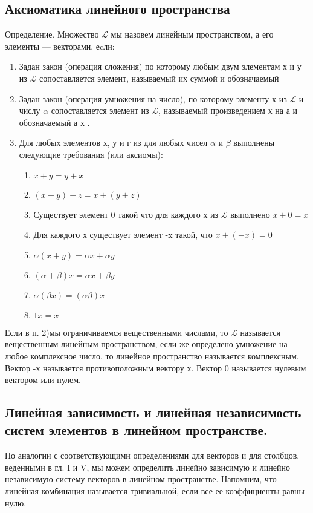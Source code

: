 \documentclass[11pt; a4paper]{report}
\theoremstyle{plain} %
\theoremstyle{defenition}
\theoremstyle{remark}
\begin{document}
\subsection{\Large Аксиоматика линейного пространства}
Определение. Множество $\mathscr{L}$ мы назовем линейным пространством, а его элементы — векторами, еcли:
\begin{enumerate}
\item Задан закон (операция сложения) по которому любым двум элементам х и у из  $\mathscr{L}$ сопоставляется элемент, называемый их суммой и обозначаемый 
\item Задан закон (операция умножения на число), по которому элементу х из $\mathscr{L}$ и числу $\alpha$ сопоставляется элемент из $\mathscr{L}$, называемый произведением х на а и обозна­чаемый а х .
\item Для любых элементов х, у и г из для любых чисел $\alpha$ и $\beta$ выполнены следующие требования (или аксиомы):
\begin{enumerate}
\item $x+y = y+x$
\item $(x + y) + z = x + (y + z)$
\item Существует элемент 0 такой что для каждого х из $\mathscr{L}$ выполнено $x + 0=x$
\item Для каждого х существует элемент -x такой, что $x + (-x) = 0$
\item $\alpha(x+y) = \alpha x + \alpha y$
\item $ (\alpha + \beta)x = \alpha x+\beta y$
\item $ \alpha( \beta x) = (\alpha \beta) x$
\item $1x = x$
\end{enumerate}
\end{enumerate}

Если в п. 2)мы ограничиваемся вещественными чис­лами, то $\mathscr{L}$ называется вещественным линейным прост­ранством, если же определено умножение на любое комплексное число, то линейное пространство называется комплексным.
Вектор -х называется противоположным вектору х.
Вектор 0 называется нулевым вектором или нулем.

\subsection{\Large Линейная зависимость и линейная независимость систем элементов в линейном пространстве.}
По аналогии с соответствую­щими определениями для векторов и для столбцов, веденными в гл. I и V, мы можем определить линейно зависимую и линейно независимую систему векторов в линейном пространстве. Напомним, что линейная комбина­ция называется тривиальной, если все ее коэффициенты равны нулю.\\
\end{document}
